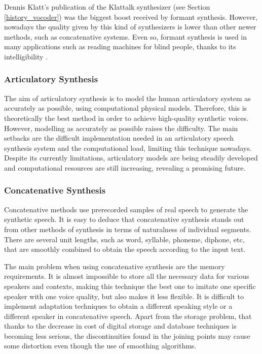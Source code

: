Dennis Klatt's publication of the Klattalk synthesizer (see Section \ref{history_vocoder}) was the biggest boost received by formant synthesis. However, nowadays the quality given by this kind of synthesizers is lower than other newer methods, such as concatenative systems. Even so, formant synthesis is used in many applications such as reading machines for blind people, thanks to its intelligibility \cite{Pickett1999}.

\subsubsection{Articulatory Synthesis}
\label{articulatory_speech_synthesis}
The aim of articulatory synthesis is to model the human articulatory system as accurately as possible, using computational physical models. Therefore, this is theoretically the best method in order to achieve high-quality synthetic voices. However, modelling as accurately as possible raises the difficulty. The main setbacks are the difficult implementation needed in an articulatory speech synthesis system and the computational load, limiting this technique nowadays. Despite its currently limitations, articulatory models are being steadily developed and computational resources are still increasing, revealing a promising future.

\subsubsection{Concatenative Synthesis}
\label{concatenative_speech_synthesis}
Concatenative methods use prerecorded samples of real speech to generate the synthetic speech. It is easy to deduce that concatenative synthesis stands out from other methods of synthesis in terms of naturalness of individual segments. There are several unit lengths, such as word, syllable, phoneme, diphone, etc, that are smoothly combined to obtain the speech according to the input text. 

The main problem when using concatenative synthesis are the memory requirements. It is almost impossible to store all the necessary data for various speakers and contexts, making this technique the best one to imitate one specific speaker with one voice quality, but also makes it less flexible. It is difficult to implement adaptation techniques to obtain a different speaking style or a different speaker in concatenative speech. Apart from the storage problem, that thanks to the decrease in cost of digital storage and database techniques is becoming less serious, the discontinuities found in the joining points may cause some distortion even though the use of smoothing algorithms.

